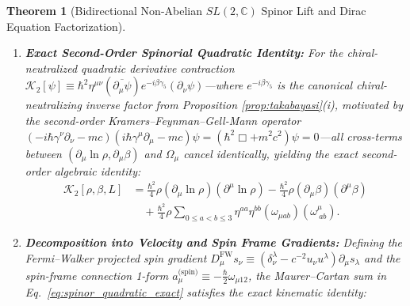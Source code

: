 \documentclass[11pt, a4paper]{article}
\newtheorem{theorem}{Theorem}[section]
\theoremstyle{definition}
\begin{document}
\begin{theorem}[Bidirectional Non-Abelian $SL(2,\mathbb{C})$ Spinor Lift and Dirac Equation Factorization]
\begin{enumerate}[label=(\roman*)]
\begin{equation}
    \label{eq:canonical_P_L}
    -u^\mu P_\mu(L) = \frac{\hbar c}{4}\epsilon^{Aab3} u_A^\mu \omega_{\mu ab} = \frac{\hbar}{2} u^\mu \omega_\mu^{\ 12} + \frac{\hbar c}{2}\left( u_1^\mu \omega_{\mu 20} + u_2^\mu \omega_{\mu 01} \right).
    \end{equation}
    In particular, along the timelike worldline ($A=0$), the longitudinal term $-u^\mu a_\mu^{\text{(spin)}} = \frac{\hbar}{2}u^\mu \omega_\mu^{\ 12}$ defines the \textbf{spin-frame connection 1-form} $a_\mu^{\text{(spin)}} \equiv -\frac{\hbar}{2}\omega_{\mu 12}$ around the spin axis $u_3^\nu = s^\nu$ (carrying the spinor half-angle factor $1/2$). By the Maurer--Cartan structure equation, $da^{\text{(spin)}} = \frac{\hbar}{2}\omega^1_{\ c}\wedge\omega^{c2}$ is generally non-vanishing for 3D spin rotations and reduces locally to an exact scalar phase gradient $a_\mu^{\text{(spin)}} = \partial_\mu S$ when $da^{\text{(spin)}} = 0$.
    \item \textbf{Exact Second-Order Spinorial Quadratic Identity:} For the chiral-neutralized quadratic derivative contraction $\mathcal{K}_2[\psi] \equiv \hbar^2 \eta^{\mu\nu}(\overline{\partial_\mu \psi})e^{-i\beta\gamma_5}(\partial_\nu \psi)$---where $e^{-i\beta\gamma_5}$ is the canonical chiral-neutralizing inverse factor from Proposition \ref{prop:takabayasi}(i), motivated by the second-order Kramers--Feynman--Gell-Mann operator $(-i\hbar\gamma^\nu\partial_\nu - mc)(i\hbar\gamma^\mu\partial_\mu - mc)\psi = (\hbar^2 \Box + m^2 c^2)\psi = 0$---all cross-terms between $(\partial_\mu \ln\rho, \partial_\mu \beta)$ and $\Omega_\mu$ cancel identically, yielding the exact second-order algebraic identity:
    \begin{equation}
    \label{eq:spinor_quadratic_exact}
    \begin{aligned}
    \mathcal{K}_2[\rho, \beta, L] &= \frac{\hbar^2}{4}\rho(\partial_\mu \ln\rho)(\partial^\mu \ln\rho) - \frac{\hbar^2}{4}\rho(\partial_\mu \beta)(\partial^\mu \beta) \\
    &\quad + \frac{\hbar^2}{4}\rho \sum_{0 \le a < b \le 3} \eta^{aa}\eta^{bb} (\omega_{\mu ab})(\omega^\mu_{\ ab}).
    \end{aligned}
    \end{equation}
    \item \textbf{Decomposition into Velocity and Spin Frame Gradients:} Defining the Fermi--Walker projected spin gradient $D_\mu^{\text{FW}} s_\nu \equiv (\delta_\nu^\lambda - c^{-2}u_\nu u^\lambda)\partial_\mu s_\lambda$ and the spin-frame connection 1-form $a_\mu^{\text{(spin)}} \equiv -\frac{\hbar}{2}\omega_{\mu 12}$, the Maurer--Cartan sum in Eq.~\eqref{eq:spinor_quadratic_exact} satisfies the exact kinematic identity:

\end{enumerate}
\end{theorem}
\end{document}
